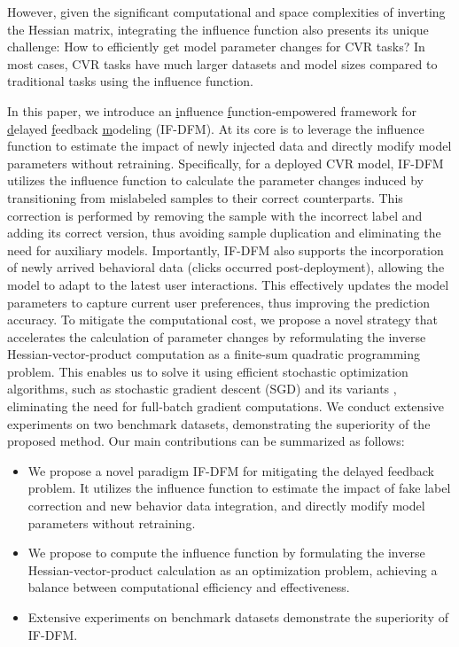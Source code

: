 However, given the significant computational and space complexities of inverting the Hessian matrix, integrating the influence function also presents its unique challenge: How to efficiently get model parameter changes for CVR tasks?
In most cases, CVR tasks have much larger datasets and model sizes compared to traditional tasks using the influence function.

In this paper, we introduce an \underline{i}nfluence \underline{f}unction-empowered framework for \underline{d}elayed \underline{f}eedback \underline{m}odeling (IF-DFM).
At its core is to leverage the influence function to estimate the impact of newly injected data
and directly modify model parameters without retraining.
Specifically, for a deployed CVR model, IF-DFM utilizes the influence function to calculate the parameter changes induced by transitioning from mislabeled samples to their correct counterparts.
This correction is performed by removing the sample with the incorrect label and adding its correct version, thus avoiding sample duplication and eliminating the need for auxiliary models.
Importantly, IF-DFM also supports the incorporation of newly arrived behavioral data (\eg clicks occurred post-deployment), allowing the model to adapt to the latest user interactions. This effectively updates the model parameters to capture current user preferences, thus improving the prediction accuracy.
To mitigate the computational cost, we propose a novel strategy that accelerates the calculation of parameter changes by reformulating the inverse Hessian-vector-product computation as a finite-sum quadratic programming problem.
This enables us to solve it using efficient stochastic optimization algorithms, such as stochastic gradient descent (SGD) \cite{robbins1951stochastic} and its variants \cite{duchi2011adaptive,kingma2014adam}, eliminating the need for full-batch gradient computations.
We conduct extensive experiments on two benchmark datasets, demonstrating the superiority of the proposed method.
Our main contributions can be summarized as follows:

\begin{itemize}[leftmargin=*]
    \item We propose a novel paradigm IF-DFM for mitigating the delayed feedback problem.
    It utilizes the influence function to estimate the impact of fake label correction and new behavior data integration, and directly modify model parameters without retraining.
    \item We propose to compute the influence function by formulating the inverse Hessian-vector-product calculation as an optimization problem, achieving a balance between computational efficiency and effectiveness.
    \item Extensive experiments on benchmark datasets demonstrate the superiority of IF-DFM. 
\end{itemize}
